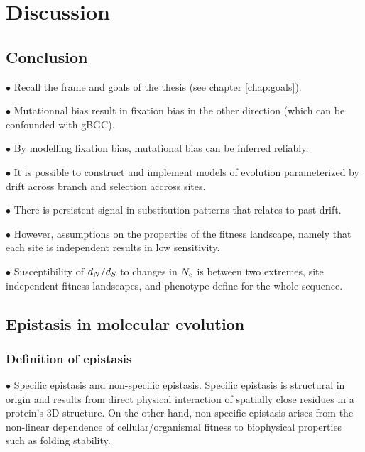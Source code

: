 \chapter{Discussion}
{
	\hypersetup{linkcolor=GREYDARK}
	\minitoc
}


\section{Conclusion}

$\bullet$ Recall the frame and goals of the thesis (see chapter \ref{chap:goals}).

$\bullet$ Mutationnal bias result in fixation bias in the other direction (which can be confounded with gBGC).

$\bullet$ By modelling fixation bias, mutational bias can be inferred reliably.

$\bullet$ It is possible to construct and implement models of evolution parameterized by drift across branch and selection accross sites.

$\bullet$ There is persistent signal in substitution patterns that relates to past drift.

$\bullet$ However, assumptions on the properties of the fitness landscape, namely that each site is independent results in low sensitivity.

$\bullet$ Susceptibility of $d_N / d_S$ to changes in $N_{\textrm{e}}$ is between two extremes, site independent fitness landscapes, and phenotype define for the whole sequence.

\section{Epistasis in molecular evolution}

\subsection{Definition of epistasis}

$\bullet$ Specific epistasis and non-specific epistasis.
Specific epistasis is structural in origin and results from direct physical interaction of spatially close residues in a protein’s 3D structure.
On the other hand, non-specific epistasis arises from the non-linear dependence of cellular/organismal fitness to biophysical properties such as folding stability.

